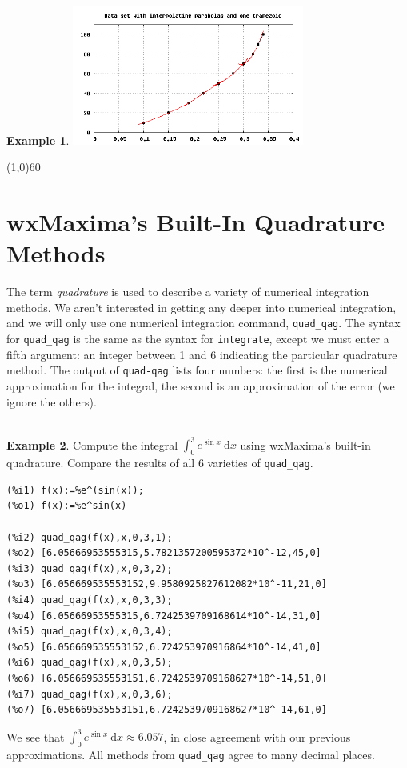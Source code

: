 \documentclass[10.5pt,twoside]{report}
\theoremstyle{definition}
\newtheorem{exmp}{Example}[section]
\begin{document}
\begin{exmp}
\includegraphics[width=3in]{example_2_3_3_1}

\end{exmp}

\line(1,0){60}
\linethickness{0.5mm}
\pagebreak

\pagebreak
\section{wxMaxima's Built-In Quadrature Methods}\label{wxMaxima's Built-In Quadrature Methods}

The term \textit{quadrature} is used to describe a variety of numerical integration methods.  We aren't interested in getting any deeper into numerical integration, and we will only use one numerical integration command, \verb|quad_qag|.  The syntax for \verb|quad_qag| is the same as the syntax for \verb|integrate|, except we must enter a fifth argument: an integer between 1 and 6 indicating the particular quadrature method.  The output of \verb|quad-qag| lists four numbers:  the first is the numerical approximation for the integral, the second is an approximation of the error (we ignore the others).\\
${}$\\

\begin{exmp} Compute the integral $\displaystyle \int_0^3 e^{\sin{x}}\ \mathrm{d}x$ using wxMaxima's built-in quadrature.  Compare the results of all 6 varieties of \verb|quad_qag|.

\begin{verbatim}
(%i1) f(x):=%e^(sin(x));
(%o1) f(x):=%e^sin(x)

(%i2) quad_qag(f(x),x,0,3,1);
(%o2) [6.05666953555315,5.7821357200595372*10^-12,45,0]
(%i3) quad_qag(f(x),x,0,3,2);
(%o3) [6.056669535553152,9.9580925827612082*10^-11,21,0]
(%i4) quad_qag(f(x),x,0,3,3);
(%o4) [6.05666953555315,6.7242539709168614*10^-14,31,0]
(%i5) quad_qag(f(x),x,0,3,4);
(%o5) [6.056669535553152,6.724253970916864*10^-14,41,0]
(%i6) quad_qag(f(x),x,0,3,5);
(%o6) [6.056669535553151,6.7242539709168627*10^-14,51,0]
(%i7) quad_qag(f(x),x,0,3,6);
(%o7) [6.056669535553151,6.7242539709168627*10^-14,61,0]
\end{verbatim}

We see that $\displaystyle \int_0^3 e^{\sin{x}}\ \mathrm{d}x\approx 6.057$, in close agreement with our previous approximations.  All methods from \verb|quad_qag| agree to many decimal places.


\end{exmp}
\end{document}
